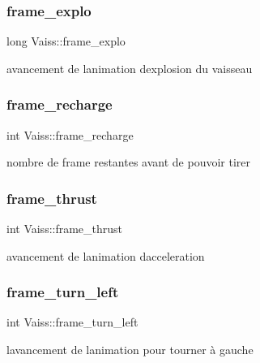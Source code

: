 \subsubsection{\texorpdfstring{frame\+\_\+explo}{frame\_explo}}
{\footnotesize\ttfamily long Vaiss\+::frame\+\_\+explo}



avancement de l\textquotesingle{}animation d\textquotesingle{}explosion du vaisseau 

\mbox{\label{struct_vaiss_a056dad119b938ab8acc9c28190ec2f71}} 
\subsubsection{\texorpdfstring{frame\+\_\+recharge}{frame\_recharge}}
{\footnotesize\ttfamily int Vaiss\+::frame\+\_\+recharge}



nombre de frame restantes avant de pouvoir tirer 

\mbox{\label{struct_vaiss_a8beb984425902e27a90e232417279a4e}} 
\subsubsection{\texorpdfstring{frame\+\_\+thrust}{frame\_thrust}}
{\footnotesize\ttfamily int Vaiss\+::frame\+\_\+thrust}



avancement de l\textquotesingle{}animation d\textquotesingle{}acceleration 

\mbox{\label{struct_vaiss_aba1fc8693cb37743370747ca934d9320}} 
\subsubsection{\texorpdfstring{frame\+\_\+turn\+\_\+left}{frame\_turn\_left}}
{\footnotesize\ttfamily int Vaiss\+::frame\+\_\+turn\+\_\+left}



l\textquotesingle{}avancement de l\textquotesingle{}animation pour tourner à gauche 

